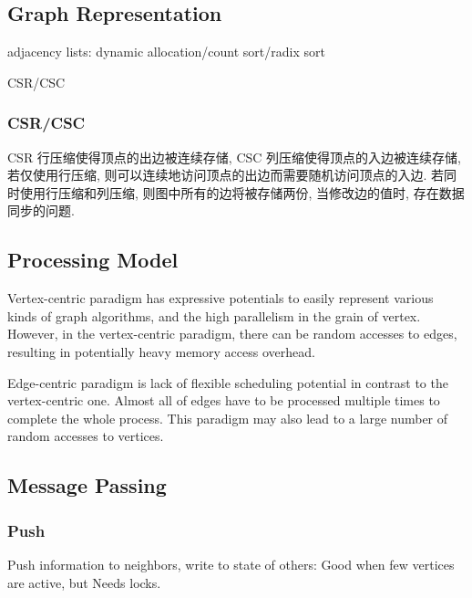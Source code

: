\documentclass[UTF8,12pt,a4paper]{article}
\begin{document}
\subsection{Graph Representation}
\begin{compactitem}
  \item adjacency lists: dynamic allocation/count sort/radix sort
  \item CSR/CSC
\end{compactitem}
\subsubsection{CSR/CSC}
CSR 行压缩使得顶点的出边被连续存储, CSC 列压缩使得顶点的入边被连续存储,
若仅使用行压缩, 则可以连续地访问顶点的出边而需要随机访问顶点的入边.
若同时使用行压缩和列压缩, 则图中所有的边将被存储两份,
当修改边的值时, 存在数据同步的问题.

\subsection{Processing Model}
Vertex-centric paradigm has expressive potentials
to easily represent various kinds of graph algorithms,
and the high parallelism in the grain of vertex.
However, in the vertex-centric paradigm,
there can be random accesses to edges,
resulting in potentially heavy memory access overhead.

Edge-centric paradigm is lack of flexible scheduling potential
in contrast to the vertex-centric one.
Almost all of edges have to be processed multiple times
to complete the whole process.
This paradigm may also lead to
a large number of random accesses to vertices.

\subsection{Message Passing}
\subsubsection{Push}
Push information to neighbors, write to state of others:
Good when few vertices are active, but Needs locks.
\end{document}

